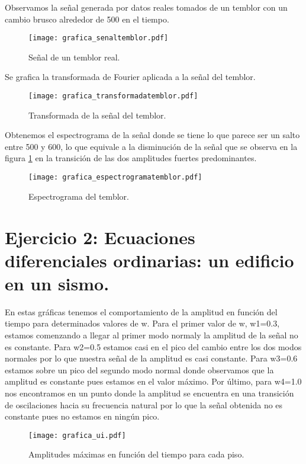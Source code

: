 \documentclass[11pt,letterpaper]{exam}
\begin{document}
Observamos la señal generada por datos reales tomados de un temblor con un cambio brusco alrededor de 500 en el tiempo. \\
\begin{figure}[H]
\centering
\texttt{[image: grafica\_senaltemblor.pdf]}
\caption{Señal de un temblor real.}
\label{fig4}
\end{figure}

Se grafica la transformada de Fourier aplicada a la señal del temblor.\\
\begin{figure}[H]
\centering
\texttt{[image: grafica\_transformadatemblor.pdf]}
\caption{Transformada de la señal del temblor.}
\label{fig5}
\end{figure}

Obtenemos el espectrograma de la señal donde se tiene lo que parece ser un salto entre 500 y 600, lo que equivale a la disminución de la señal que se observa en la figura \ref{fig4} en la transición de las dos amplitudes fuertes predominantes. \\
\begin{figure}[H]
\centering
\texttt{[image: grafica\_espectrogramatemblor.pdf]}
\caption{Espectrograma del temblor.}
\label{fig6}
\end{figure}

\noindent
\section{Ejercicio 2: Ecuaciones diferenciales ordinarias: un edificio en un sismo.}

En estas gráficas tenemos el comportamiento de la amplitud en función del tiempo para determinados valores de w. Para el primer valor de w, w1=0.3, estamos comenzando a llegar al primer modo normaly la amplitud de la señal no es constante. Para w2=0.5 estamos casi en el pico del cambio entre los dos modos normales por lo que nuestra señal de la amplitud es casi constante. Para w3=0.6 estamos sobre un pico del segundo modo normal donde observamos que la amplitud es constante pues estamos en el valor máximo. Por último, para w4=1.0 nos encontramos en un punto donde la amplitud se encuentra en una transición de oscilaciones hacia su frecuencia natural por lo que la señal obtenida no es constante pues no estamos en ningún pico. \\
\begin{figure}[H]
\centering
\texttt{[image: grafica\_ui.pdf]}
\caption{Amplitudes máximas en función del tiempo para cada piso.}
\label{fig7}
\end{figure}
\end{document}
